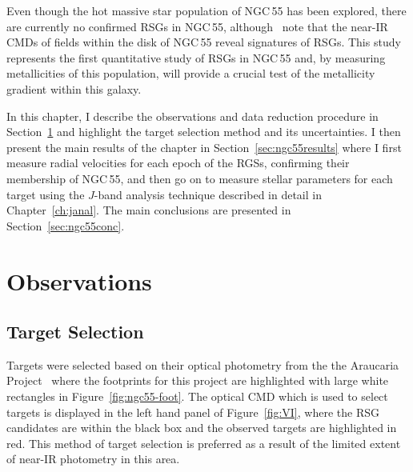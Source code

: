 Even though the hot massive star population of NGC\,55 has been explored,
there are currently no confirmed RSGs in NGC\,55, although~\cite{2005ApJ...622..279D} note that the near-IR CMDs of fields within the disk of NGC\,55 reveal signatures of RSGs.
This study represents the first quantitative study of RSGs in NGC\,55 and, by measuring metallicities of this population, will provide a crucial test of the metallicity gradient within this galaxy.

In this chapter, I describe the observations and data reduction procedure in Section~\ref{sec:ngc55obs} and highlight the target selection method and its uncertainties.
I then present the main results of the chapter in Section~\ref{sec:ngc55results} where I first measure radial velocities for each epoch of the RGSs, confirming their membership of NGC\,55, and then go on to measure stellar parameters for each target using the $J$-band analysis technique described in detail in Chapter~\ref{ch:janal}.
The main conclusions are presented in Section~\ref{sec:ngc55conc}.


\section{Observations} %
\label{sec:ngc55obs}

\subsection{Target Selection} %
\label{sub:target_selection}


Targets were selected based on their optical photometry from the the Araucaria Project~\citep{2005Msngr.121...23G} where the footprints for this project are highlighted with large white rectangles in Figure~\ref{fig:ngc55-foot}.
The optical CMD which is used to select targets is displayed in the left hand panel of Figure~\ref{fig:VI}, where the RSG candidates are within the black box and the observed targets are highlighted in red.
This method of target selection is preferred as a result of the limited extent of near-IR photometry in this area.



